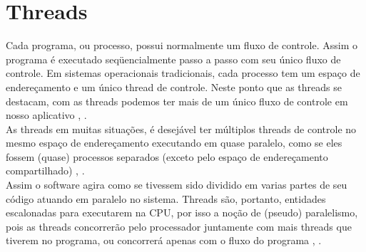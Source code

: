 \newpage
\section{Threads}\label{sec:Threads}


Cada programa, ou processo, possui normalmente um fluxo de controle. Assim o programa é executado seqüencialmente passo a passo com seu único fluxo de controle. Em sistemas operacionais tradicionais, cada processo tem um espaço de endereçamento e um único thread de controle. Neste ponto que as threads se destacam, com as threads podemos ter mais de um único fluxo de controle em nosso aplicativo \cite{Tanenbaum2016}, \cite{dev2020}.\\
As threads em  muitas situações, é desejável ter múltiplos threads de controle no mesmo espaço de endereçamento executando em quase paralelo, como se eles fossem (quase) processos separados (exceto pelo espaço de endereçamento compartilhado) \cite{Tanenbaum2016}, \cite{dev2020}.\\
Assim o software agira como se tivessem sido dividido em varias partes de seu código atuando em paralelo no sistema. Threads são, portanto, entidades escalonadas para executarem na CPU, por isso a noção de (pseudo) paralelismo, pois as threads concorrerão pelo processador juntamente com mais threads que tiverem no programa, ou concorrerá apenas com o fluxo do programa \cite{Tanenbaum2016}, \cite{dev2020}.
